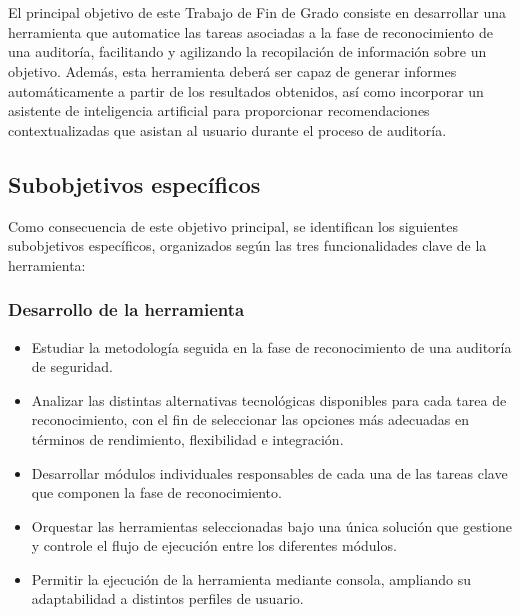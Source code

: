 \chapter{\objectivesname} \label{sec:objetivos}
\newpage
\begin{parskipenv}
El principal objetivo de este Trabajo de Fin de Grado consiste en desarrollar una herramienta que automatice las tareas asociadas a la fase de reconocimiento de una auditoría, facilitando y agilizando la recopilación de información sobre un objetivo. Además, esta herramienta deberá ser capaz de generar informes automáticamente a partir de los resultados obtenidos, así como incorporar un asistente de inteligencia artificial para proporcionar recomendaciones contextualizadas que asistan al usuario durante el proceso de auditoría.

\section{Subobjetivos específicos}
Como consecuencia de este objetivo principal, se identifican los siguientes subobjetivos específicos, organizados según las tres funcionalidades clave de la herramienta:

\subsection*{Desarrollo de la herramienta}
\begin{itemize}
  \item Estudiar la metodología seguida en la fase de reconocimiento de una auditoría de seguridad.
  
  \item Analizar las distintas alternativas tecnológicas disponibles para cada tarea de reconocimiento, con el fin de seleccionar las opciones más adecuadas en términos de rendimiento, flexibilidad e integración.
  
  \item Desarrollar módulos individuales responsables de cada una de las tareas clave que componen la fase de reconocimiento.
  
  \item Orquestar las herramientas seleccionadas bajo una única solución que gestione y controle el flujo de ejecución entre los diferentes módulos.
  
  \item Permitir la ejecución de la herramienta mediante consola, ampliando su adaptabilidad a distintos perfiles de usuario.
  

\end{itemize}
\end{parskipenv}
